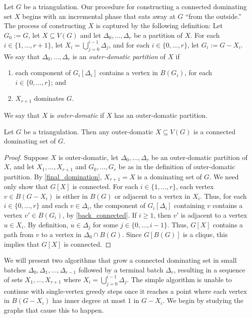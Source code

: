 \documentclass{patmorin}
\newcommand{\defin}[1]{\emph{\textcolor{brightmaroon}{#1}}}
\begin{document}
Let $G$ be a triangulation.  Our procedure for constructing a connected dominating set $X$ begins with an incremental phase that eats away at $G$ ``from the outside.'' The process of constructing $X$ is captured by the following definition: Let $G_0:=G$, let $X\subseteq V(G)$ and let $\Delta_0,\ldots,\Delta_{r}$ be a partition of $X$. For each $i\in\{1,\ldots,r+1\}$, let $X_i = \bigcup_{j=0}^{i-1}\Delta_j$, and for each $i\in\{0,\ldots,r\}$, let $G_i:=G-X_i$. We say that $\Delta_0,\ldots,\Delta_{r}$ is an \defin{outer-domatic partition} of $X$ if
\begin{enumerate}[label=(P\arabic*),labelwidth=\widthof{(P2)}, leftmargin=!]
  \item\label{back_connected} each component of $G_i[\Delta_i]$ contains a vertex in $B(G_i)$, for each $i\in\{0,\ldots,r\}$; and
  \item $X_{r+1}$ dominates $G$.\label{final_domination}
\end{enumerate} 
We say that $X$ is \defin{outer-domatic} if $X$ has an outer-domatic partition.

\begin{lem}\label{outer_domatic}
    Let $G$ be a triangulation.  Then any outer-domatic $X\subseteq V(G)$ is a connected dominating set of $G$.
\end{lem}
\begin{proof}
  Suppose $X$ is outer-domatic, let $\Delta_0,\ldots,\Delta_{r}$ be an outer-domatic partition of $X$, and let $X_1,\ldots,X_{r+1}$ and $G_0,\ldots,G_r$ be as in the definition of outer-domatic partition.  By \ref{final_domination}, $X_{r+1}=X$ is a dominating set of $G$. We need only show that $G[X]$ is connected.  
  For each $i\in\{1,\ldots,r\}$, each vertex $v\in B(G-X_i)$ is either in $B(G)$ or adjacent to a vertex in $X_i$. 
  Thus, for each $i\in\{0,\ldots,r\}$ and each $v\in \Delta_i$, the component of $G_i[\Delta_i]$ containing $v$ contains a vertex $v'\in B(G_i)$, by \ref{back_connected}.  If $i\ge 1$, then $v'$ is adjacent to a vertex $u\in X_{i}$.  By definition, $u\in \Delta_j$ for some $j\in\{0,\ldots,i-1\}$.  Thus, $G[X]$ contains a path from $v$ to a vertex in $\Delta_0\cap B(G)$.  Since $G[B(G)]$ is a clique, this implies that $G[X]$ is connected.
\end{proof}

We will present two algorithms that grow a connected dominating set in small batches $\Delta_0,\Delta_1,\ldots,\Delta_{r-1}$ followed by a terminal batch $\Delta_r$, resulting in a sequence of sets $X_1,\ldots,X_{r+1}$ where $X_{i}=\bigcup_{j=0}^{i-1}\Delta_j$.  The simple algorithm is unable to continue with single-vertex greedy steps once it reaches a point where each vertex in $B(G-X_i)$ has inner degree at most $1$ in $G-X_i$.  We begin by studying the graphs that cause this to happen.
\end{document}
